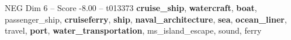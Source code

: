\begin{textsample}{NEG Dim 6 – Score -8.00 – t013373}  \label{ex:f6_neg_031}
\textbf{cruise\_ship}, \textbf{watercraft}, \textbf{boat}, passenger\_ship, \textbf{cruiseferry}, \textbf{ship}, \textbf{naval\_architecture}, \textbf{sea}, \textbf{ocean\_liner}, travel, \textbf{port}, \textbf{water\_transportation}, ms\_island\_escape, sound, ferry

\end{textsample}
